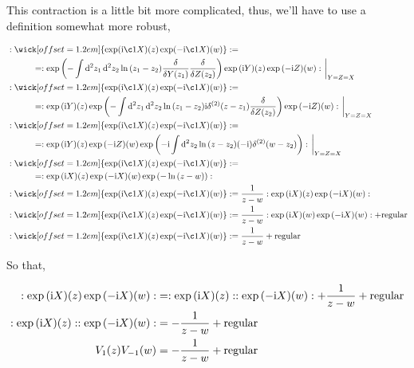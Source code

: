 This contraction is a little bit more complicated, thus, we'll have to use a definition somewhat more robust,

\begin{align*}
    &\cnord{\wick[offset=1.2em]{\textnormal{exp}(\im \c1{X})\qty(z)\exp(-\im \c1{X})\qty(w)}}=\\
    &\quad\quad\quad=\cnord{\exp\qty(-\int\dd[2]{z_1}\dd[2]{z_2}\ln\qty(z_1-z_2)\fdv{}{Y\qty(z_1)}\fdv{}{Z\qty(z_2)})\exp\qty(\im Y)\qty(z)\exp\qty(-\im Z)\qty(w)}\eval_{Y=Z=X}\\
    &\cnord{\wick[offset=1.2em]{\textnormal{exp}(\im \c1{X})\qty(z)\exp(-\im \c1{X})\qty(w)}}=\\
    &\quad\quad\quad=\cnord{\exp\qty(\im Y)\qty(z)\exp\qty(-\int\dd[2]{z_1}\dd[2]{z_2}\ln\qty(z_1-z_2)\im\delta^{\qty(2)}\qty(z-z_1)\fdv{}{Z\qty(z_2)})\exp\qty(-\im Z)\qty(w)}\eval_{Y=Z=X}\\
    &\cnord{\wick[offset=1.2em]{\textnormal{exp}(\im \c1{X})\qty(z)\exp(-\im \c1{X})\qty(w)}}=\\
    &\quad\quad\quad=\cnord{\exp\qty(\im Y)\qty(z)\exp\qty(-\im Z)\qty(w)\exp\qty(-\im\int\dd[2]{z_2}\ln\qty(z-z_2)\qty(-\im)\delta^{\qty(2)}\qty(w-z_2))}\eval_{Y=Z=X}\\
    &\cnord{\wick[offset=1.2em]{\textnormal{exp}(\im \c1{X})\qty(z)\exp(-\im \c1{X})\qty(w)}}=\\
    &\quad\quad\quad=\cnord{\exp\qty(\im X)\qty(z)\exp\qty(-\im X)\qty(w)\exp\qty(-\ln\qty(z-w))}\\
    &\cnord{\wick[offset=1.2em]{\textnormal{exp}(\im \c1{X})\qty(z)\exp(-\im \c1{X})\qty(w)}}=\frac{1}{z-w}\cnord{\exp\qty(\im X)\qty(z)\exp\qty(-\im X)\qty(w)}\\
    &\cnord{\wick[offset=1.2em]{\textnormal{exp}(\im \c1{X})\qty(z)\exp(-\im \c1{X})\qty(w)}}=\frac{1}{z-w}\cnord{\exp\qty(\im X)\qty(w)\exp\qty(-\im X)\qty(w)}+\textnormal{regular}\\
    &\cnord{\wick[offset=1.2em]{\textnormal{exp}(\im \c1{X})\qty(z)\exp(-\im \c1{X})\qty(w)}}=\frac{1}{z-w}+\textnormal{regular}
\end{align*}

So that,

\begin{align*}
    :\exp\qty(\textnormal{i} X)\qty(z)\exp\qty(-\textnormal{i} X)\qty(w):&=:\exp\qty(\textnormal{i} X)\qty(z)::\exp\qty(-\textnormal{i} X)\qty(w):+\frac{1}{z-w}+\textnormal{regular}\\
    :\exp\qty(\textnormal{i} X)\qty(z)::\exp\qty(-\textnormal{i} X)\qty(w):&=-\frac{1}{z-w}+\textnormal{regular}\\
    V_1\qty(z)V_{-1}\qty(w)&=-\frac{1}{z-w}+\textnormal{regular}
\end{align*}

